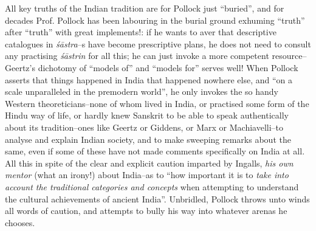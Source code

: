 All key truths of the Indian tradition are for Pollock just “buried”, and for decades Prof. Pollock has been labouring in the burial ground exhuming “truth” after “truth” with great implements!: if he wants to aver that descriptive catalogues in \textit{śāstra}–s have become prescriptive plans, he does not need to consult any practising \textit{śāstrin} for all this; he can just invoke a more competent resource–Geertz’s dichotomy of “models of” and “models for” serves well! When Pollock asserts that things happened in India that happened nowhere else, and “on a scale unparalleled in the premodern world”, he only invokes the so handy Western theoreticians–none of whom lived in India, or practised some form of the Hindu way of life, or hardly knew Sanskrit to be able to speak authentically about its tradition–ones like Geertz or Giddens, or Marx or Machiavelli–to analyse and explain Indian society, and to make sweeping remarks about the same, even if some of these have not made comments specifically on India at all. All this in spite of the clear and explicit caution imparted by Ingalls, \textit{his own mentor} (what an irony!) about India–as to “how important it is to \textit{take into account the traditional categories and concepts} when attempting to understand the cultural achievements of ancient India”. Unbridled, Pollock throws unto winds all words of caution, and attempts to bully his way into whatever arenas he chooses.

